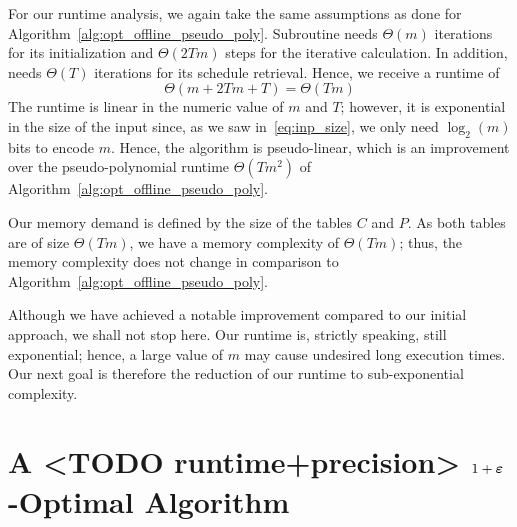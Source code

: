 For our runtime analysis, we again take the same assumptions as done for Algorithm~\ref{alg:opt_offline_pseudo_poly}. Subroutine  needs $\Theta(m)$ iterations for its initialization and $\Theta(2Tm)$ steps for the iterative calculation. In addition,  needs $\Theta(T)$ iterations for its schedule retrieval. Hence, we receive a runtime of 
\begin{equation*}
	\Theta(m+2Tm+T)=\Theta(Tm)
\end{equation*}
The runtime is linear in the numeric value of $m$ and $T$; however, it is exponential in the size of the input since, as we saw in~\eqref{eq:inp_size}, we only need $\log_2(m)$ bits to encode $m$. Hence, the algorithm is pseudo-linear, which is an improvement over the pseudo-polynomial runtime $\Theta(Tm^2)$ of Algorithm~\ref{alg:opt_offline_pseudo_poly}.

Our memory demand is defined by the size of the tables $C$ and $P$. As both tables are of size $\Theta(Tm)$, we have a memory complexity of $\Theta(Tm)$; thus, the memory complexity does not change in comparison to Algorithm~\ref{alg:opt_offline_pseudo_poly}.

Although we have achieved a notable improvement compared to our initial approach, we shall not stop here. Our runtime is, strictly speaking, still exponential; hence, a large value of $m$ may cause undesired long execution times. Our next goal is therefore the reduction of our runtime to sub-exponential complexity.

\section{A <TODO runtime+precision> $1+\boldsymbol\varepsilon$-Optimal Algorithm}
